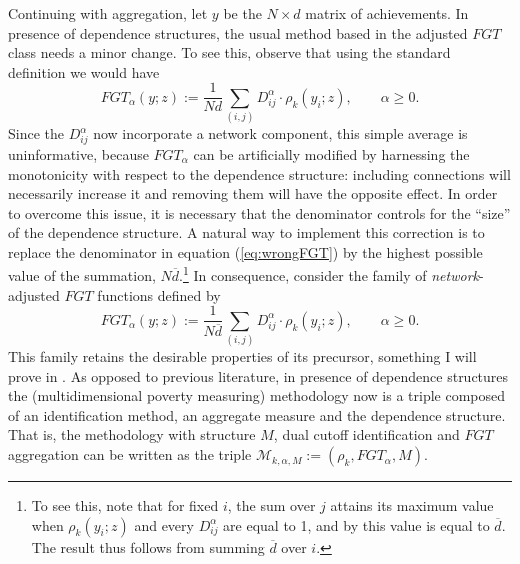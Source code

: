 \documentclass[english, a4paper,12pt]{article}
\begin{document}
Continuing with aggregation, let $y$ be the $N \times d$ matrix of achievements. In presence of dependence structures, the usual method based in the adjusted $FGT$ class needs a minor change. To see this, observe that using the standard definition we would have
	\begin{equation} \label{eq:wrongFGT}
		FGT_{\alpha}(y ; z) := \frac{1}{Nd} \sum_{(i,j)} D^{\alpha}_{ij} \cdot \rho_{k}(y_{i} ; z), \qquad \alpha \geq 0.
	\end{equation}
Since the $D_{ij}^{\alpha}$ now incorporate a network component, this simple average is uninformative, because $FGT_{\alpha}$ can be artificially modified by harnessing the monotonicity with respect to the dependence structure: including connections will necessarily increase it and removing them will have the opposite effect. In order to overcome this issue, it is necessary that the denominator controls for the ``size'' of the dependence structure. A natural way to implement this correction is to replace the denominator in equation (\ref{eq:wrongFGT}) by the highest possible value of the summation, $N\overline{d}$.\footnote{To see this, note that for fixed $i$, the sum over $j$ attains its maximum value when $\rho_{k}(y_{i}; z)$ and every $D_{ij}^{\alpha}$ are equal to 1, and by  this value is equal to $\overline{d}$. The result thus follows from summing $\overline{d}$ over $i$.} In consequence, consider the family of \textit{network}-adjusted $FGT$ functions defined by
	\begin{equation} \label{eq:rightFGT}
		FGT_{\alpha}(y ; z) := \frac{1}{N\overline{d}} \sum_{(i,j)} D^{\alpha}_{ij} \cdot \rho_{k}(y_{i} ; z), \qquad \alpha \geq 0.
	\end{equation}
This family retains the desirable properties of its precursor, something I will prove in . As opposed to previous literature, in presence of dependence structures the (multidimensional poverty measuring) methodology now is a triple composed of an identification method, an aggregate measure and the dependence structure. That is, the methodology with structure $M$, dual cutoff identification and $FGT$ aggregation can be written as the triple $\mathcal{M}_{k,\alpha, M} := (\rho_{k}, FGT_{\alpha}, M)$.

\end{document}
